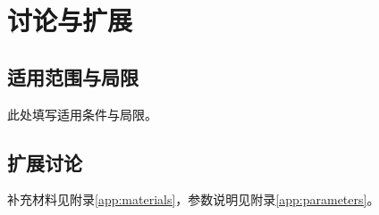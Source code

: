 \chapter{讨论与扩展}
\label{chap:discussion}

\section{适用范围与局限}
此处填写适用条件与局限。

\section{扩展讨论}
补充材料见附录\ref{app:materials}，参数说明见附录\ref{app:parameters}。
